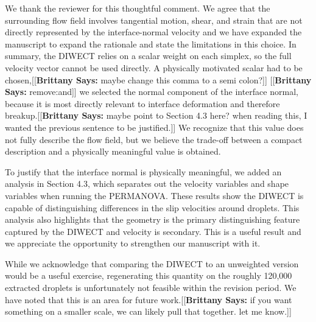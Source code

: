 \documentclass[11pt]{article}
\newcommand{\payAttention}[3]{{\color{#1}[[\textbf{#2: }#3]]}}
\newcommand{\xSays}[3]{\payAttention{#1}{#2 Says}{#3}}
\newcommand{\brittany}[1]{\xSays{blue}{Brittany}{#1}}
\begin{document}
We thank the reviewer for this thoughtful comment. We agree that the surrounding
flow field involves tangential motion, shear, and strain that are not directly
represented by the interface-normal velocity and we have expanded the manuscript
to expand the rationale and state the limitations in this choice. In summary,
the DIWECT relies on a scalar weight on each simplex, so the full velocity
vector cannot be used directly. A physically motivated scalar had to be
chosen,\brittany{maybe change this comma to a semi colon?}
\brittany{remove:and} we selected the normal component of the interface normal,
because it is most directly relevant to interface deformation and therefore
breakup.\brittany{maybe point to Section 4.3 here? when reading this, I wanted
the previous sentence to be justified.}
We recognize that this value does not fully describe the flow field, but we believe the trade-off between a compact description and a physically meaningful value is obtained.

To justify that the interface normal is physically meaningful, we added an analysis in Section 4.3, which separates out the velocity variables and shape variables when running the PERMANOVA. These results show the DIWECT is capable of distinguishing differences in the slip velocities around droplets. This analysis also highlights that the geometry is the primary distinguishing feature captured by the DIWECT and velocity is secondary. This is a useful result and we appreciate the opportunity to strengthen our manuscript with it.

While we acknowledge that comparing the DIWECT to an unweighted version would be
a useful exercise, regenerating this quantity on the roughly 120,000 extracted
droplets is unfortunately not feasible within the revision period. We have noted
that this is an area for future work.\brittany{if you want something on a
smaller scale, we can likely pull that together. let me know.}
\end{document}
